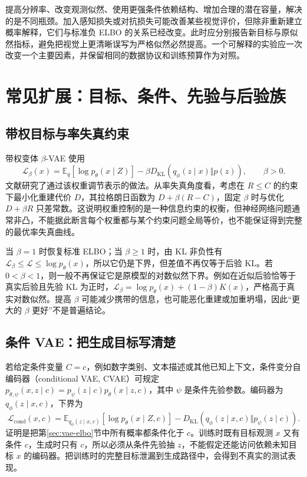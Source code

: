 \documentclass[UTF8,12pt,a4paper,fontset=fandol]{ctexart}
\begin{document}
提高分辨率、改变观测似然、使用更强条件依赖结构、增加合理的潜在容量，解决的是不同瓶颈。加入感知损失或对抗损失可能改善某些视觉评价，但除非重新建立概率解释，它们与标准负 ELBO 的关系已经改变。此时应分别报告新目标与原似然指标，避免把视觉上更清晰误写为严格似然必然提高。一个可解释的实验应一次改变一个主要因素，并保留相同的数据协议和训练预算作为对照。

\section{常见扩展：目标、条件、先验与后验族}
\label{sec:vae-extensions}

\subsection{带权目标与率失真约束}
带权变体 $\beta$-VAE 使用
\begin{equation}
 \mathcal L_\beta(x)=\mathbb E_q[\log p_\theta(x\mid Z)]
              -\beta D_{\mathrm{KL}}(q_\phi(z\mid x)\Vert p(z)),
 \qquad \beta>0.
 \label{eq:vae-beta}
\end{equation}
文献\cite{higgins2017}研究了通过该权重调节表示的做法。从率失真角度看，考虑在 $R\leq C$ 的约束下最小化重建代价 $D$，其拉格朗日函数为 $D+\beta(R-C)$，固定 $\beta$ 时与优化 $D+\beta R$ 只差常数。这说明权重控制的是一种信息约束的权衡，但神经网络问题通常非凸，不能据此断言每个权重都与某个约束问题全局等价，也不能保证得到完整的最优率失真曲线。

当 $\beta=1$ 时恢复标准 ELBO；当 $\beta\geq1$ 时，由 KL 非负性有 $\mathcal L_\beta\leq\mathcal L\leq\log p_\theta(x)$，所以它仍是下界，但差值不再仅等于后验 KL。若 $0<\beta<1$，则一般不再保证它是原模型的对数似然下界。例如在近似后验恰等于真实后验且先验 KL 为正时，$\mathcal L_\beta=\log p_\theta(x)+(1-\beta)K(x)$，严格高于真实对数似然。提高 $\beta$ 可能减少携带的信息，也可能恶化重建或加重坍塌，因此“更大的 $\beta$ 更好”不是普遍结论。

\subsection{条件 VAE：把生成目标写清楚}
若给定条件变量 $C=c$，例如数字类别、文本描述或其他已知上下文，条件变分自编码器（conditional VAE, CVAE）可规定 $p_{\theta,\psi}(x,z\mid c)=p_\psi(z\mid c)p_\theta(x\mid z,c)$，其中 $\psi$ 是条件先验参数。编码器为 $q_\phi(z\mid x,c)$，下界为
\begin{equation}
 \mathcal L_{\mathrm{cond}}(x,c)
 =\mathbb E_{q_\phi(z\mid x,c)}[\log p_\theta(x\mid Z,c)]
  -D_{\mathrm{KL}}(q_\phi(z\mid x,c)\Vert p_\psi(z\mid c)).
 \label{eq:vae-conditional}
\end{equation}
证明是把第\ref{sec:vae-elbo}节中所有概率都条件化于 $c$。训练时既有目标观测 $x$ 又有条件 $c$，生成时只有 $c$，所以必须从条件先验抽 $z$，不能假定还能访问依赖未知目标 $x$ 的编码器。把训练时的完整目标泄漏到生成路径中，会得到不真实的测试表现。
\end{document}
